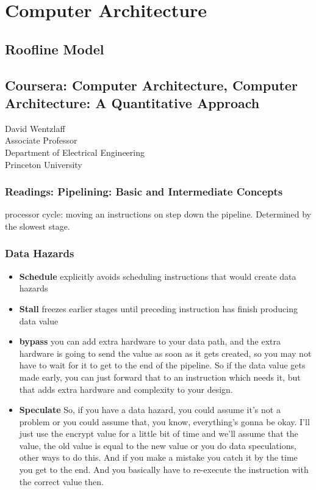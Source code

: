 \documentclass[UTF8]{article}
\begin{document}
\section{Computer Architecture}
\subsection{Roofline Model}

\subsection{Coursera: Computer Architecture, Computer Architecture: A Quantitative Approach}
David Wentzlaff\\
Associate Professor\\
Department of Electrical Engineering\\
Princeton University\\
\subsubsection{Readings: Pipelining: Basic and Intermediate Concepts}

processor cycle: moving an instructions on step down the pipeline. Determined by the slowest stage.




\subsubsection{Data Hazards}
\begin{itemize}
	\item \textbf{Schedule} explicitly avoids scheduling instructions that would create data hazards
	\item \textbf{Stall} freezes earlier stages until preceding instruction has finish producing data value
	\item \textbf{bypass} you can add extra hardware to your data path, and the extra hardware is going to send the value as soon as it gets created, so you may not have to wait for it to get to the end of the pipeline. So if the data value gets made early, you can just forward that to an instruction which needs it, but that adds extra hardware and complexity to your design. 
	\item \textbf{Speculate} So, if you have a data hazard, you could assume it's not a problem or you could assume that, you know, everything's gonna be okay. I'll just use the encrypt value for a little bit of time and we'll assume that the value, the old value is equal to the new value or you do data speculations, other ways to do this. And if you make a mistake you catch it by the time you get to the end. And you basically have to re-execute the instruction with the correct value then.  
\end{itemize}



\end{document}
